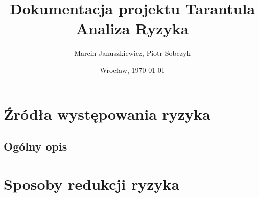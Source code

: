 \documentclass[11pt,leqno]{article}
\title{\LARGE Dokumentacja projektu \textbf{Tarantula}\\
							Analiza Ryzyka}
\author{Marcin Januszkiewicz, Piotr Sobczyk}
\date{Wrocław, \today}
\begin{document}
\maketitle 
\newpage
\tableofcontents
\newpage
\pagestyle{headings}

\section{Źródła występowania ryzyka}

\subsection{Ogólny opis}


\section{Sposoby redukcji ryzyka}
\end{document}
